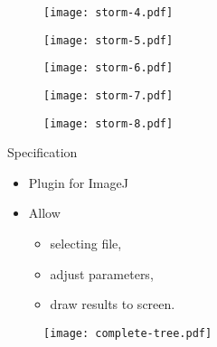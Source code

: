 \documentclass{beamer}
\begin{document}
\begin{frame}
	\begin{figure}
		\texttt{[image: storm-4.pdf]}
	\end{figure}
\end{frame}

\begin{frame}
	\begin{figure}
		\texttt{[image: storm-5.pdf]}
	\end{figure}
\end{frame}

\begin{frame}
	\begin{figure}
		\texttt{[image: storm-6.pdf]}
	\end{figure}
\end{frame}

\begin{frame}
	\begin{figure}
		\texttt{[image: storm-7.pdf]}
	\end{figure}
\end{frame}

\begin{frame}
	\begin{figure}
		\texttt{[image: storm-8.pdf]}
	\end{figure}
\end{frame}

\begin{frame}{Specification}
	\begin{itemize}
		\item Plugin for ImageJ
		\item Allow
			\begin{itemize}
				\item selecting file,
				\item adjust parameters,
				\item draw results to screen.
			\end{itemize}
	\end{itemize}

\end{frame}

\begin{frame}
	\begin{figure}
		\texttt{[image: complete-tree.pdf]}
	\end{figure}
\end{frame}
\end{document}
